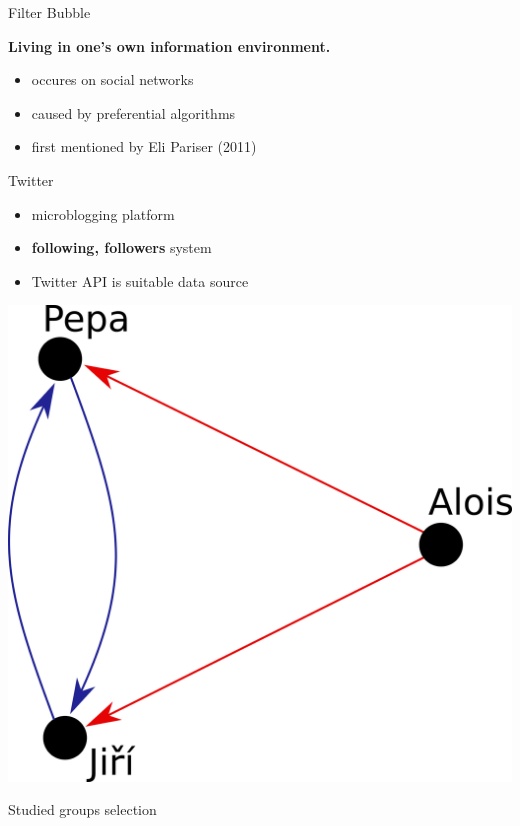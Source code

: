 \documentclass[final]{beamer}
\begin{document}
\begin{frame}[fragile]
\begin{columns}[T]
\begin{column}{.33\textwidth}
\begin{block}{Filter Bubble}
    \center
    \begin{large}\textbf{Living in one's own information environment.}\end{large}
    \vspace{0.8cm}
    \begin{itemize}
        \item occures on social networks
        \item caused by preferential algorithms
        \item first mentioned by Eli Pariser (2011)
    \end{itemize}
\end{block}
\begin{block}{Twitter}
	\begin{itemize}
		\item microblogging platform
        \item \textbf{following, followers} system
		\item Twitter API is suitable data source
	\end{itemize}
	\center
	\includegraphics[scale=0.55]{./Pics/pepa.png}
\end{block}
\begin{block}{Studied groups selection}

\end{block}
\end{column}
\end{columns}
\end{frame}
\end{document}
